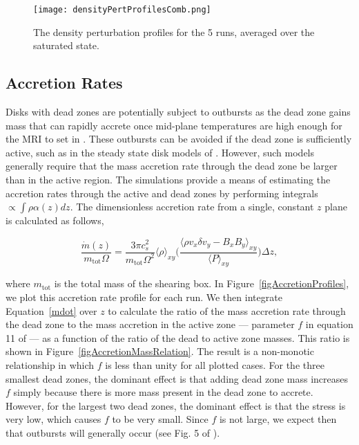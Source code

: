 \begin{figure}[p]
\centering
\texttt{[image: densityPertProfilesComb.png]}
\caption{The density perturbation profiles for the 5 runs, averaged over the saturated state.}
\label{figDensPertProfiles}
\end{figure}


\subsection{Accretion Rates}
Disks with dead zones are potentially subject to outbursts as the dead zone gains mass
that can rapidly accrete once mid-plane temperatures are high enough
for the MRI to set in \citep{armitage01,zhu09,martin11}. These outbursts can be avoided if the dead zone is sufficiently active, such as
in the steady state disk models of \cite{terquem08}.
However, such models generally require that the mass accretion rate
through the dead zone be larger than in the active region.
The simulations provide a means of estimating the accretion rates
through the active and dead 
zones by performing integrals $\propto \int \rho \alpha(z) dz$.
The dimensionless accretion rate from a single, constant $z$ plane is calculated as follows,

\begin{equation}
\label{mdot}
\frac{\dot{m}(z)}{m_{\text{tot}}\Omega} = \frac{3\pi c_s^2}{m_{\text{tot}}\Omega^2} \langle\rho\rangle_{xy} \bigg(\frac{\langle \rho v_x \delta v_y - B_x B_y\rangle_{xy}}{\langle P \rangle_{xy}}\bigg)\Delta z,             
\end{equation}    

\noindent where $m_{\text{tot}}$ is the total mass of the shearing box.  In Figure~\ref{figAccretionProfiles}, we plot this accretion rate profile for each run.
 We then integrate Equation~\ref{mdot} over $z$ to calculate the ratio of the mass accretion rate through the dead zone
to the mass accretion in the active zone --- parameter $f$ in equation 11
of \cite{martin14} --- as a function of the ratio of the dead to active zone masses. This ratio is shown in Figure~\ref{figAccretionMassRelation}.
The result is a non-monotic relationship in which $f$ is less than unity for all
plotted cases.
For the three smallest dead zones, the dominant effect is that adding dead zone mass increases $f$ simply because there is more mass present in the dead zone to accrete.  However, for the largest two dead zones, the dominant effect is that the stress is very low, which causes $f$ to be very small. Since $f$ is not large, we expect then that outbursts
will generally occur (see Fig. 5 of \cite{martin14}).

